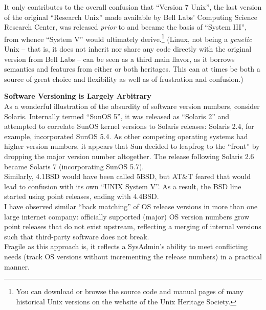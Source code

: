 It only contributes to the overall confusion that
``Version 7 Unix'', the last
version of the original ``Research Unix'' made
available by Bell Labs' Computing Science Research
Center, was released {\em prior} to and became the
basis of  ``System III'', from
whence ``System V'' would ultimately
derive.\footnote{You can download or browse the source
code and manual pages of many historical Unix versions
on the website of the  Unix Heritage
Society\cite{history:tuhs}.} (Linux, not being a {\em
genetic} Unix -- that is, it does not inherit nor
share any code directly with the original version from
Bell Labs -- can be seen as a third main flavor, as it
borrows semantics and features from either or both
heritages.  This can at times be both a source of
great choice and flexibility as well as of frustration
and confusion.)

\begin{sidenote}
{\bf Software Versioning is Largely Arbitrary} \\
As a wonderful illustration of the absurdity of
software version numbers, consider Solaris.
Internally termed ``SunOS 5'', it was released as
``Solaris 2'' and attempted to correlate SunOS kernel
versions to Solaris releases: Solaris 2.4, for
example, incorporated SunOS 5.4.  As other competing
operating systems had higher version numbers, it
appears that Sun decided to leapfrog to the ``front''
by dropping the major version number altogether.  The
release following Solaris 2.6 became Solaris 7
(incorporating SunOS 5.7). \\ [10pt]

Similarly, 4.1BSD would have been called 5BSD, but
AT\&T feared that would lead to confusion with its own
``UNIX System V''.  As a result, the BSD line started
using point releases, ending with 4.4BSD. \\ [10pt]

I have observed similar ``back matching'' of OS
release versions in more than one large internet
company: officially supported (major) OS version
numbers grow point releases that do not exist
upstream, reflecting a merging of internal versions
such that third-party software does not break. \\
[10pt]

Fragile as this approach is, it reflects a SysAdmin's
ability to meet conflicting needs (track OS versions
without incrementing the release numbers) in a
practical manner.
\end{sidenote}

